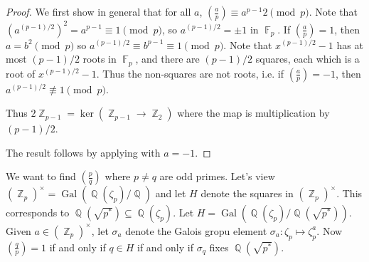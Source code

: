 \documentclass[11pt, a4paper]{memoir}
\DeclareMathOperator{\Q}{{\mathbb{Q}}}
\DeclareMathOperator{\Z}{{\mathbb{Z}}}
\DeclareMathOperator{\F}{{\mathbb{F}}}
\theoremstyle{change}
\theoremstyle{plain}
\theoremstyle{nonumberplain}
\newtheorem{proof}{Proof}
\DeclareMathOperator{\Gal}{Gal}
\newcommand{\lgs}[2]{\ensuremath{\left(\frac{#1}{#2}\right)}}
\begin{document}
\begin{proof}
    We first show in general that for all $a$, $\lgs{a}{p}\equiv a^{p-1}{2}\pmod{p}$.
    Note that $\left(a^{(p-1)/2}\right)^2=a^{p-1}\equiv 1\pmod{p}$, so $a^{(p-1)/2}=\pm 1$ in $\F_p$.
    If $\lgs{a}{p}=1$, then $a=b^2\pmod{p}$ so $a^{(p-1)/2}\equiv b^{p-1}\equiv 1\pmod{p}$.
    Note that $x^{(p-1)/2}-1$ has at most $(p-1)/2$ roots in $\F_p$, and there are $(p-1)/2$ squares, each which is a root of $x^{(p-1)/2}-1$.
    Thus the non-squares are not roots, i.e. if $\lgs{a}{p}=-1$, then $a^{(p-1)/2}\nequiv 1\pmod{p}$.
    \begin{center}
    \end{center}
    Thus $2\Z_{p-1}=\ker(\Z_{p-1}\to\Z_2)$ where the map is multiplication by $(p-1)/2$.

    The result follows by applying with $a=-1$.
\end{proof}
We want to find $\lgs{p}{q}$ where $p\neq q$ are odd primes.
Let's view $(\Z_p)^\times=\Gal(\Q(\zeta_p)/\Q)$ and let $H$ denote the squares in $(\Z_p)^\times$.
This corresponds to $\Q(\sqrt{p^*})\subseteq\Q(\zeta_p)$.
Let $H=\Gal(\Q(\zeta_p)/\Q(\sqrt{p^*}))$.
Given $a\in(\Z_p)^\times$, let $\sigma_a$ denote the Galois gropu element $\sigma_a:\zeta_p\mapsto\zeta_p^a$.
Now $\lgs{q}{p}=1$ if and only if $q\in H$ if and only if $\sigma_q$ fixes $\Q(\sqrt{p^*})$.
\end{document}
